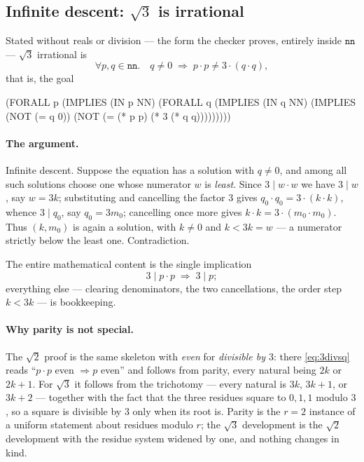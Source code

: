 \subsection{Infinite descent: \texorpdfstring{$\sqrt3$}{sqrt3} is irrational}
\label{sec:ex-sqrt3}

Stated without reals or division --- the form the checker proves, entirely
inside $\mathtt{nn}$ --- $\sqrt3$ irrational is
\[
  \forall p,q \in \mathtt{nn}.\quad
  q \neq 0 \;\Longrightarrow\; p\cdot p \neq 3\cdot(q\cdot q) ,
\]
that is, the goal
\begin{VNBsnip}
(FORALL p (IMPLIES (IN p NN) (FORALL q (IMPLIES (IN q NN)
  (IMPLIES (NOT (= q 0)) (NOT (= (* p p) (* 3 (* q q)))))))))
\end{VNBsnip}

\paragraph{The argument.}
Infinite descent.  Suppose the equation has a solution with $q \neq 0$, and
among all such solutions choose one whose numerator $w$ is \emph{least}.  Since
$3 \mid w\cdot w$ we have $3 \mid w$, say $w = 3k$; substituting and cancelling
the factor $3$ gives $q_0\cdot q_0 = 3\cdot(k\cdot k)$, whence $3 \mid q_0$, say
$q_0 = 3m_0$; cancelling once more gives $k\cdot k = 3\cdot(m_0\cdot m_0)$.  Thus
$(k,m_0)$ is again a solution, with $k \neq 0$ and $k < 3k = w$ --- a numerator
strictly below the least one.  Contradiction.

The entire mathematical content is the single implication
\begin{equation}\label{eq:3divsq}
  3 \mid p\cdot p \;\Longrightarrow\; 3 \mid p ;
\end{equation}
everything else --- clearing denominators, the two cancellations, the order
step $k < 3k$ --- is bookkeeping.

\paragraph{Why parity is not special.}
The $\sqrt2$ proof is the same skeleton with \emph{even} for \emph{divisible by
$3$}: there \eqref{eq:3divsq} reads ``$p\cdot p$ even $\Rightarrow p$ even'' and
follows from parity, every natural being $2k$ or $2k+1$.  For $\sqrt3$ it follows
from the trichotomy --- every natural is $3k$, $3k+1$, or $3k+2$ --- together
with the fact that the three residues square to $0,1,1$ modulo $3$, so a square
is divisible by $3$ only when its root is.  Parity is the $r=2$ instance of a
uniform statement about residues modulo $r$; the $\sqrt3$ development is the
$\sqrt2$ development with the residue system widened by one, and nothing changes
in kind.

